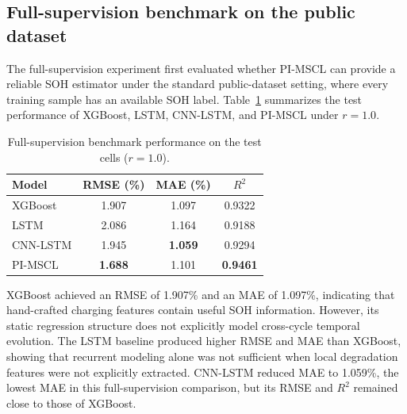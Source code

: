 
\iffalse
\subsection{Full-supervision benchmark on the public dataset}
\label{subsec:full_supervision_results}

The full-supervision experiment first evaluated whether PI-MSCL can provide a reliable SOH estimator under the standard public-dataset setting, where every training sample has an available SOH label. Table~\ref{tab:full_supervision} summarizes the test performance of XGBoost, LSTM, CNN-LSTM, and PI-MSCL under $r=1.0$.

\begin{table}[t]
\caption{Full-supervision benchmark performance on the test cells ($r=1.0$).}
\label{tab:full_supervision}
\centering
\begin{tabular}{lccc}
\toprule
Model & RMSE (\%) & MAE (\%) & $R^2$ \\
\midrule
XGBoost & 1.907 & 1.097 & 0.9322 \\
LSTM & 2.086 & 1.164 & 0.9188 \\
CNN-LSTM & 1.945 & \textbf{1.059} & 0.9294 \\
PI-MSCL & \textbf{1.688} & 1.101 & \textbf{0.9461} \\
\bottomrule
\end{tabular}
\end{table}

XGBoost achieved an RMSE of 1.907\% and an MAE of 1.097\%, indicating that hand-crafted charging features contain useful SOH information. However, its static regression structure does not explicitly model cross-cycle temporal evolution. The LSTM baseline produced higher RMSE and MAE than XGBoost, showing that recurrent modeling alone was not sufficient when local degradation features were not explicitly extracted. CNN-LSTM reduced MAE to 1.059\%, the lowest MAE in this full-supervision comparison, but its RMSE and $R^2$ remained close to those of XGBoost.

